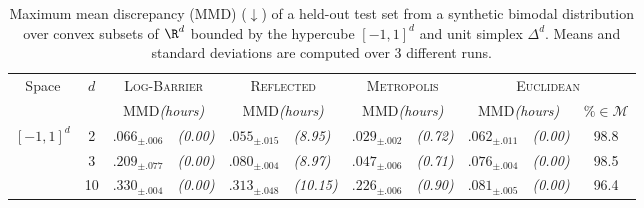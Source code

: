 \begin{table}[t]
	\caption{
		Maximum mean discrepancy (MMD) (\(\downarrow\)) of a held-out test set from a synthetic bimodal distribution over convex subsets of \(\R^d\) bounded by the hypercube \([-1,1]^d\) and unit simplex \(\Delta^d\).
		Means and standard deviations are computed over 3 different runs.
	}
	\label{tab:synthetic_polytope_mmd}
	\vspace{1em}
	\centering

	\begin{tabular}{ccr@{}lr@{}lr@{}lr@{}lc}
		\toprule
		\multirow{2}{*}{Space} & \multirow{2}{*}{\(d\)} & \multicolumn{2}{c}{\scshape Log-Barrier}                & \multicolumn{2}{c}{\scshape Reflected}                  & \multicolumn{2}{c}{\scshape Metropolis}                 & \multicolumn{3}{c}{\scshape Euclidean}                                                                                                     \\
		                       &                      & \multicolumn{2}{c}{\textsc{MMD}\emph{(hours)}} & \multicolumn{2}{c}{\textsc{MMD}\emph{(hours)}} & \multicolumn{2}{c}{\textsc{MMD}\emph{(hours)}} & \multicolumn{2}{c}{\textsc{MMD}\emph{(hours)}} & \(\%\in\mathcal{M}\)                                                               \\
		\midrule
		\multirow{3}{*}{\([-1,1]^d\)}
		                       & 2                    & \(.066_{\pm{.006}}\)                             & \emph{(0.00)}                                  & \(.055_{\pm{.015}}\)                             & \emph{(8.95)}                                  & \({.029_{\pm{.002}}}\) & \emph{(0.72)} & \(.062_{\pm{.011}}\) & \emph{(0.00)} & 98.8 \\
		                       & 3                    & \(.209_{\pm{.077}}\)                             & \emph{(0.00)}                                  & \(.080_{\pm{.004}}\)                             & \emph{(8.97)}                                  & \({.047_{\pm{.006}}}\) & \emph{(0.71)} & \(.076_{\pm{.004}}\) & \emph{(0.00)} & 98.5 \\
		                       & 10                   & \(.330_{\pm{.004}}\)                             & \emph{(0.00)}                                  & \(.313_{\pm{.048}}\)                             & \emph{(10.15)}                                 & \({.226_{\pm{.006}}}\) & \emph{(0.90)} & \(.081_{\pm{.005}}\) & \emph{(0.00)} & 96.4 \\

\end{tabular}
\end{table}

